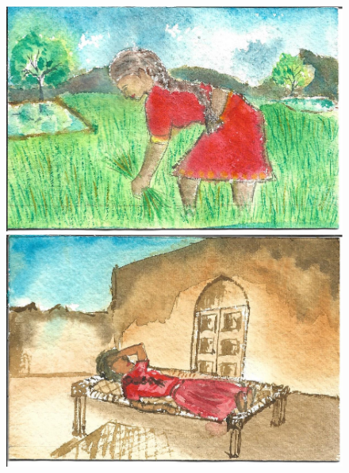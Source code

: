 \documentclass[12pt]{article}
\begin{document}
\begin{figure}[h!]
\centering
\includegraphics[width=.331\paperwidth]{pictures/AW}
\hspace*{1cm}\includegraphics[width=.331\paperwidth]{pictures/AR}

\vspace*{1cm}


\end{figure}
\end{document}
